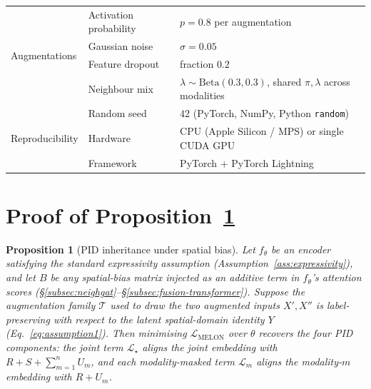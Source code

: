 \documentclass{article}
\theoremstyle{plain}
\newtheorem{proposition}{Proposition}
\theoremstyle{definition}
\begin{document}
\begin{table}[H]
\begin{tabular}{lll}
\midrule
\multirow{4}{*}{Augmentations}
  & Activation probability    & $p=0.8$ per augmentation \\
  & Gaussian noise            & $\sigma=0.05$ \\
  & Feature dropout           & fraction $0.2$ \\
  & Neighbour mix             & $\lambda\sim\mathrm{Beta}(0.3,0.3)$, shared $\pi,\lambda$ across modalities \\
\midrule
\multirow{3}{*}{Reproducibility}
  & Random seed               & $42$ (PyTorch, NumPy, Python \texttt{random}) \\
  & Hardware                  & CPU (Apple Silicon / MPS) or single CUDA GPU \\
  & Framework                 & PyTorch + PyTorch Lightning \\
\bottomrule
\end{tabular}
\end{table}

\section{Proof of Proposition~\ref{prop:pid-inheritance}}\label{app:proof}

\begin{proposition}[PID inheritance under spatial bias]\label{prop:pid-inheritance}
Let $f_\theta$ be an encoder satisfying the standard expressivity assumption (Assumption~\ref{ass:expressivity}), and let $B$ be any spatial-bias matrix injected as an additive term in $f_\theta$'s attention scores (\S\ref{subsec:neighgat}--\S\ref{subsec:fusion-transformer}). Suppose the augmentation family $\mathcal{T}$ used to draw the two augmented inputs $X', X''$ is label-preserving with respect to the latent spatial-domain identity $Y$ (Eq.~\ref{eq:assumption1}). Then minimising $\mathcal{L}_{\mathrm{MELON}}$ over $\theta$ recovers the four PID components: the joint term $\mathcal{L}_{\star}$ aligns the joint embedding with $R + S + \sum_{m=1}^{n} U_m$, and each modality-masked term $\mathcal{L}_{m}$ aligns the modality-$m$ embedding with $R + U_m$.
\end{proposition}
\end{document}
